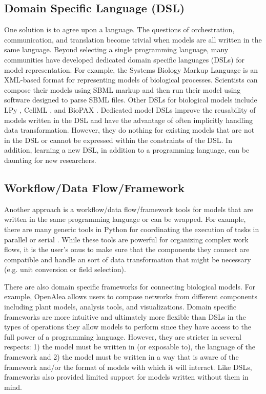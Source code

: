 \documentclass[journal]{IEEEtran}
\begin{document}
\subsection{Domain Specific Language (DSL)}\label{SS:dsl}
%
One solution is to agree upon a language. The questions of orchestration, communication, and translation become trivial when models are all written in the same language. Beyond selecting a single programming language, many communities have  developed dedicated domain specific languages (DSLs) for model representation. For example, the Systems Biology Markup Language \citep[SBML][]{Hucka2003} is an XML-based format for representing models of biological processes. Scientists can compose their models using SBML markup and then run their model using software designed to parse SBML files. Other DSLs for biological models include LPy \citep{Boudon2012}, CellML \citep{Cuellar2003}, and BioPAX \citep{Demir2010}. Dedicated model DSLs improve the reusability of models written in the DSL and have the advantage of often implicitly handling data transformation. However, they do nothing for existing models that are not in the DSL or cannot be expressed within the constraints of the DSL. In addition, learning a new DSL, in addition to a programming language, can be daunting for new researchers.

\subsection{Workflow/Data Flow/Framework}\label{SS:framework}
%
Another approach is a workflow/data flow/framework tools for models that are written in the same programming language or can be wrapped. For example, there are many generic tools in Python for coordinating the execution of tasks in parallel or serial \citep[e.g.][]{babuji18, celery, luigi}. While these tools are powerful for organizing complex work flows, it is the user's onus to make sure that the components they connect are compatible and handle an sort of data transformation that might be necessary (e.g. unit conversion or field selection).

There are also domain specific frameworks for connecting biological models. For example, OpenAlea \citep{Pradal2015} allows users to compose networks from different components including plant models, analysis tools, and visualizations. Domain specific frameworks are more intuitive and ultimately more flexible than DSLs in the types of operations they allow models to perform since they have access to the full power of a programming language. However, they are stricter in several respects: 1) the model must be written in (or exposable to), the language of the framework and 2) the model must be written in a way that is aware of the framework and/or the format of models with which it will interact. Like DSLs, frameworks also provided limited support for models written without them in mind. 
\end{document}
